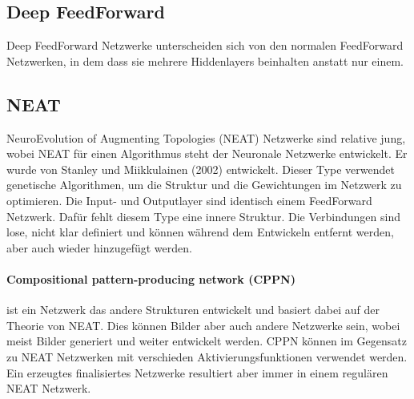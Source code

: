 
\subsection{Deep FeedForward}
\label{subsec:DeepFeedForward}

Deep FeedForward Netzwerke unterscheiden sich von den normalen FeedForward Netzwerken, in dem dass sie mehrere Hiddenlayers beinhalten anstatt nur einem.

\subsection{NEAT}

NeuroEvolution of Augmenting Topologies (NEAT) Netzwerke sind relative jung, wobei NEAT für einen Algorithmus steht der Neuronale Netzwerke entwickelt.
Er wurde von Stanley und Miikkulainen (2002) entwickelt. 
Dieser Type verwendet genetische Algorithmen, um die Struktur und die Gewichtungen im Netzwerk zu optimieren.
Die Input- und Outputlayer sind identisch einem FeedForward Netzwerk.
Dafür fehlt diesem Type eine innere Struktur. 
Die Verbindungen sind lose, nicht klar definiert und können während dem Entwickeln entfernt werden, aber auch wieder hinzugefügt werden.


\paragraph{Compositional pattern-producing network (CPPN)} ist ein Netzwerk das andere Strukturen entwickelt und basiert dabei auf der Theorie von NEAT. 
Dies können Bilder aber auch andere Netzwerke sein, wobei meist Bilder generiert und weiter entwickelt werden.
CPPN können im Gegensatz zu NEAT Netzwerken mit verschieden Aktivierungsfunktionen verwendet werden.
Ein erzeugtes finalisiertes Netzwerke resultiert aber immer in einem regulären NEAT Netzwerk.



